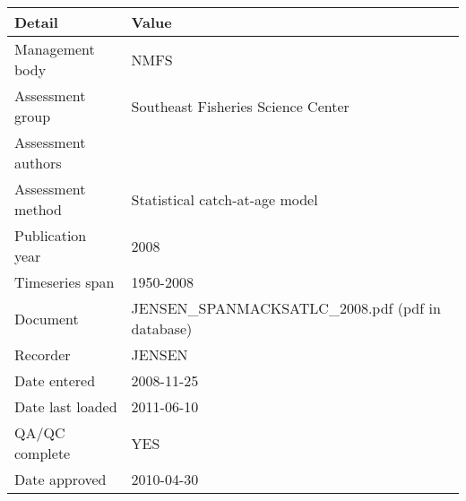 \begin{table}[htb]
\centering
\begin{tabular}{lp{7cm}}
\toprule
Detail & Value \\
\midrule
Management body    & NMFS                                              \\
Assessment group   & Southeast Fisheries Science Center                \\
Assessment authors &                                                   \\
Assessment method  & Statistical catch-at-age model                    \\
Publication year   & 2008                                              \\
Timeseries span    & 1950-2008                                         \\
Document           & JENSEN\_SPANMACKSATLC\_2008.pdf (pdf in database) \\
Recorder           & JENSEN                                            \\
Date entered       & 2008-11-25                                        \\
Date last loaded   & 2011-06-10                                        \\
QA/QC complete     & YES                                               \\
Date approved      & 2010-04-30                                        \\
\bottomrule
\end{tabular}
\label{tab:assessdet}
\end{table}
